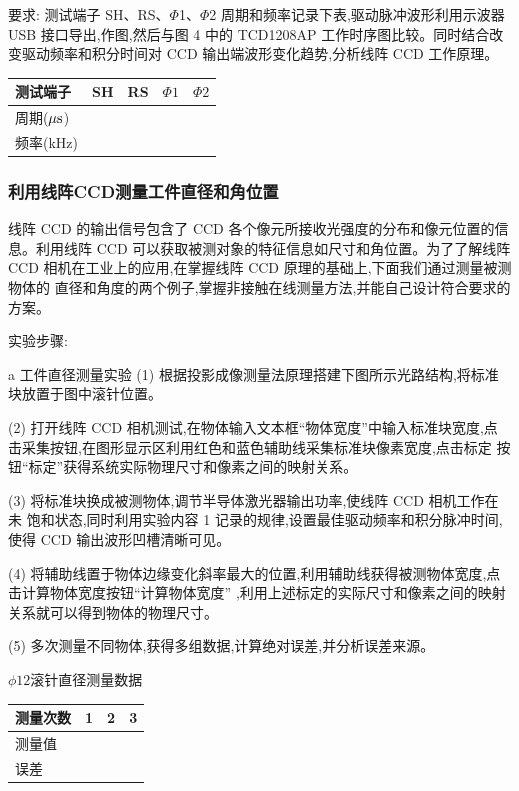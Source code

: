 \documentclass{ctexart}
\begin{document}
要求: 测试端子 SH、RS、$\Phi$1、$\Phi$2 周期和频率记录下表,驱动脉冲波形利用示波器 USB 接口导出,作图,然后与图 4 中的 TCD1208AP 工作时序图比较。同时结合改变驱动频率和积分时间对 CCD 输出端波形变化趋势,分析线阵 CCD 工作原理。

\begin{tabular}{|p{5em}|p{5em}|p{5em}|p{5em}|p{5em}|}
	\hline 
	测试端子     &SH       &RS      & $\Phi 1$&$\Phi 2$     \\
	\hline
	周期($\mu \rm{s}$) &  & &  &  \\
	\hline
	频率(kHz)&        &            & &  \\
	\hline	
\end{tabular}


\subsubsection{利用线阵CCD测量工件直径和角位置}
线阵 CCD 的输出信号包含了 CCD 各个像元所接收光强度的分布和像元位置的信
息。利用线阵 CCD 可以获取被测对象的特征信息如尺寸和角位置。为了了解线阵 CCD
相机在工业上的应用,在掌握线阵 CCD 原理的基础上,下面我们通过测量被测物体的
直径和角度的两个例子,掌握非接触在线测量方法,并能自己设计符合要求的方案。

实验步骤:

a 工件直径测量实验
(1) 根据投影成像测量法原理搭建下图所示光路结构,将标准块放置于图中滚针位置。

(2) 打开线阵 CCD 相机测试,在物体输入文本框“物体宽度”中输入标准块宽度,点
击采集按钮,在图形显示区利用红色和蓝色辅助线采集标准块像素宽度,点击标定
按钮“标定”获得系统实际物理尺寸和像素之间的映射关系。

(3) 将标准块换成被测物体,调节半导体激光器输出功率,使线阵 CCD 相机工作在未
饱和状态,同时利用实验内容 1 记录的规律,设置最佳驱动频率和积分脉冲时间,
使得 CCD 输出波形凹槽清晰可见。

(4) 将辅助线置于物体边缘变化斜率最大的位置,利用辅助线获得被测物体宽度,点击计算物体宽度按钮“计算物体宽度”
,利用上述标定的实际尺寸和像素之间的映射
关系就可以得到物体的物理尺寸。

(5) 多次测量不同物体,获得多组数据,计算绝对误差,并分析误差来源。

$\phi 12$滚针直径测量数据

\begin{tabular}{|p{5em}|p{5em}|p{5em}|p{5em}|}
	\hline 
        测量次数 & 1& 2&3     \\
	\hline
	测量值 & & &  \\
	\hline
	误差 & & &  \\
	\hline	
\end{tabular}
\end{document}

